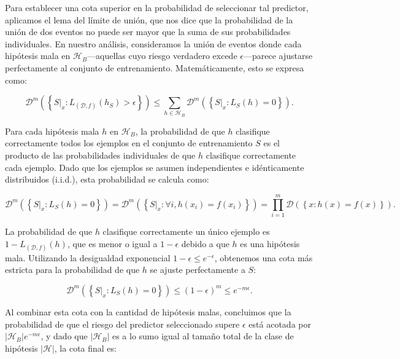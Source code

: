 Para establecer una cota superior en la probabilidad de seleccionar tal predictor, aplicamos el lema del límite de unión, que nos dice que la probabilidad de la unión de dos eventos no puede ser mayor que la suma de sus probabilidades individuales. En nuestro análisis, consideramos la unión de eventos donde cada hipótesis mala en $\mathcal{H}_B$—aquellas cuyo riesgo verdadero excede $\epsilon$—parece ajustarse perfectamente al conjunto de entrenamiento. Matemáticamente, esto se expresa como:

\begin{equation}
\mathcal{D}^m \left(\left\{S|_x : L_{(\mathcal{D},f)}(h_S) > \epsilon\right\}\right) \leq \sum_{h\in \mathcal{H}_B} \mathcal{D}^m \left(\left\{S|_x : L_S(h)=0\right\}\right).
\end{equation}

Para cada hipótesis mala $h$ en $\mathcal{H}_B$, la probabilidad de que $h$ clasifique correctamente todos los ejemplos en el conjunto de entrenamiento $S $ es el producto de las probabilidades individuales de que $h$ clasifique correctamente cada ejemplo. Dado que los ejemplos se asumen independientes e idénticamente distribuidos (i.i.d.), esta probabilidad se calcula como:

\begin{equation}
    \mathcal{D}^m\left(\left\{S|_x : L_S(h)=0\right\}\right) = \mathcal{D}^m\left(\left\{S|_x  : \forall i, h(x_i)=f(x_i)\right\}\right) =\prod_{i=1}^{m}\mathcal{D}\left(\left\{x:h(x)=f(x)\right\}\right).
\end{equation}

La probabilidad de que $h$ clasifique correctamente un único ejemplo es $1 - L_{(\mathcal{D},f)}(h)$, que es menor o igual a $1-\epsilon$ debido a que $h$ es una hipótesis mala. Utilizando la desigualdad exponencial $1-\epsilon\leq e^{-\epsilon}$, obtenemos una cota más estricta para la probabilidad de que $h$ se ajuste perfectamente a $S$:

\begin{equation}
\mathcal{D}^m\left(\left\{S|_x : L_S(h)=0\right\}\right) \leq (1-\epsilon)^m\leq e^{-m\epsilon}.
\end{equation}

Al combinar esta cota con la cantidad de hipótesis malas, concluimos que la probabilidad de que el riesgo del predictor seleccionado supere $\epsilon$ está acotada por $|\mathcal{H}_B|e^{-m\epsilon}$, y dado que  $|\mathcal{H}_B|$ es a lo sumo igual al tamaño total de la clase de hipótesis $|\mathcal{H}|$, la cota final es:

